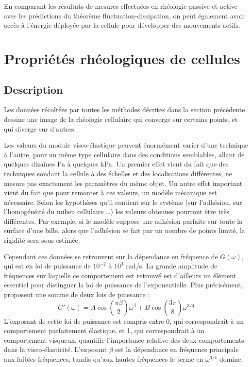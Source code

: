 \documentclass{report}
\begin{document}
En comparant les résultats de mesures effectuées en rhéologie passive et active avec les prédictions du théorème fluctuation-dissipation, on peut également avoir accès à l'énergie déployée par la cellule pour développer des mouvements actifs. 



\section{Propriétés rhéologiques de cellules}

\subsection{Description}

Les données récoltées par toutes les méthodes décrites dans la section précédente dessine une image de la rhéologie cellulaire qui converge sur certains points, et qui diverge sur d'autres. 

Les valeurs du module visco-élastique peuvent énormément varier d'une technique à l'autre, pour un même type cellulaire dans des conditions semblables, allant de quelques dizaines Pa à quelques kPa. 
Un premier effet vient du fait que des techniques sondant la cellule à des échelles et des localisations différentes, ne mesure pas exactement les paramètres du même objet. 
Un autre effet important vient du fait que pour remonter à ces valeurs, un modèle mécanique est nécessaire. Selon les hypothèses qu'il contient sur le système (sur l'adhésion, sur l'homogénéité du milieu cellulaire \dots) les valeurs obtenues pourront être très différentes. 
Par exemple, si le modèle suppose une adhésion parfaite sur toute la surface d'une bille, alors que l'adhésion se fait par un nombre de points limité, la rigidité sera sous-estimée. 

Cependant ces données se retrouvent sur la dépendance en fréquence de $G(\omega)$, qui est en loi de puissance de $10^{-2}$ à $10^3$ rad/s. La grande amplitude de fréquences sur laquelle ce comportement est retrouvé est d'ailleurs un élément essentiel pour distinguer la loi de puissance de l'exponentielle. Plus précisément, \cite{hoffner} proposent une somme de deux lois de puissance : 
$$G'(\omega)= A \cos \left(\frac{\pi \beta}{2}\right) \omega^{\beta} + B \cos\left(\frac{3 \pi}{8}\right) \omega^{3/4}$$
L'exposant de cette loi de puissance est compris entre 0, qui correspondrait à un comportement parfaitement élastique, et 1, qui correspondrait à un comportement visqueux, quantifie l'importance relative des deux comportements dans la visco-élasticité. 
L'exposant $\beta$ est la dépendance en fréquence principale aux faibles fréquences, tandis qu'aux hautes fréquences le terme en $\omega^{3/4}$ domine. 
\end{document}
